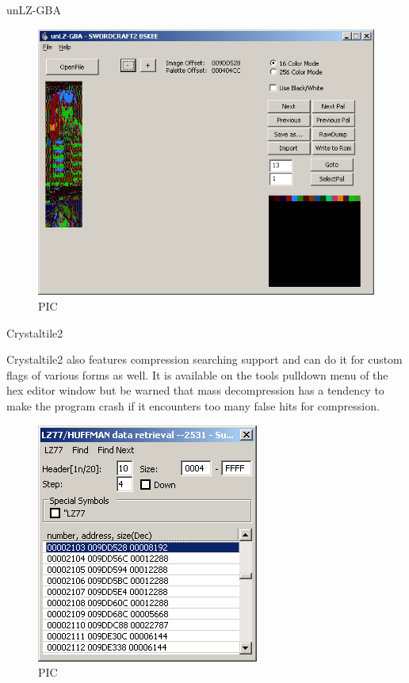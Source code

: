 \documentclass[
]{book}
\begin{document}
unLZ-GBA

\begin{figure}
\centering
\includegraphics{images/187_home_fast6191_romhackingguide_unrenamed_fil___mhackingguidecompressionsearching_unLZGBA_1.png}
\caption{PIC}
\end{figure}

Crystaltile2

Crystaltile2 also features compression searching support and can do it for custom flags of various forms as well. It is available on the tools pulldown menu of the hex editor window but be warned that mass decompression has a tendency to make the program crash if it encounters too many false hits for compression.

\begin{figure}
\centering
\includegraphics{images/188_home_fast6191_romhackingguide_unrenamed_fil___ingguidecompressionsearching_crystaltile2_1.png}
\caption{PIC}
\end{figure}
\end{document}
